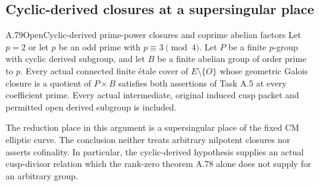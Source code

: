 \subsection{Cyclic-derived closures at a supersingular place}

\begin{statement}{A.79}{Open}{Cyclic-derived prime-power closures and coprime abelian factors}
Let \(p=2\) or let \(p\) be an odd prime with
\(p\equiv3\pmod4\). Let \(P\) be a finite
\(p\)-group with cyclic derived subgroup, and let
\(B\) be a finite abelian group of order prime to \(p\).
Every actual connected finite \'etale cover of
\(E\setminus\{O\}\) whose geometric Galois closure
is a quotient of \(P\times B\) satisfies both assertions
of Task A.5 at every coefficient prime. Every actual
intermediate, original induced cusp packet and permitted
open derived subgroup is included.

The reduction place in this argument is a supersingular
place of the fixed CM elliptic curve. The conclusion
neither treats arbitrary nilpotent closures nor asserts
cofinality. In particular, the cyclic-derived hypothesis
supplies an actual cusp-divisor relation which the rank-zero
theorem A.78 alone does not supply for an arbitrary group.
\end{statement}

